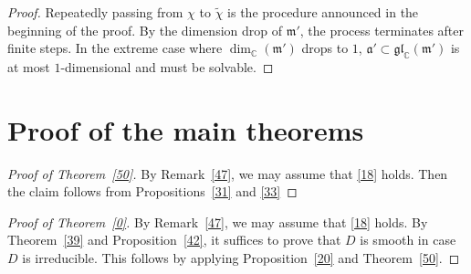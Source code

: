\begin{proof}
Repeatedly passing from $\chi$ to $\tilde\chi$ is the procedure announced in the beginning of the proof. 
By the dimension drop of ${\mathfrak{m}}'$, the process terminates after finite steps. 
In the extreme case where $\dim_{\mathds{C}}({\mathfrak{m}}')$ drops to $1$, ${\mathfrak{a}}'\subset{\mathfrak{gl}}_{\mathds{C}}({\mathfrak{m}}')$ is at most $1$-dimensional and must be solvable.
\end{proof}

\section{Proof of the main theorems}

\begin{proof}[Proof of Theorem~\ref{50}]
By Remark~\ref{47}, we may assume that \eqref{18} holds.
Then the claim follows from Propositions~\ref{31} and \ref{33}
\end{proof}

\begin{proof}[Proof of Theorem~\ref{0}]
By Remark~\ref{47}, we may assume that \eqref{18} holds.
By Theorem~\ref{39} and Proposition~\ref{42}, it suffices to prove that $D$ is smooth in case $D$ is irreducible.
This follows by applying Proposition~\ref{20} and Theorem~\ref{50}.
\end{proof}





